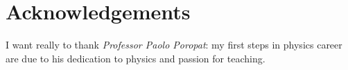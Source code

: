 \chapter*{Acknowledgements}

I want really to thank {\it Professor Paolo Poropat}: my first steps in
physics career are due to his dedication to physics and passion for teaching.